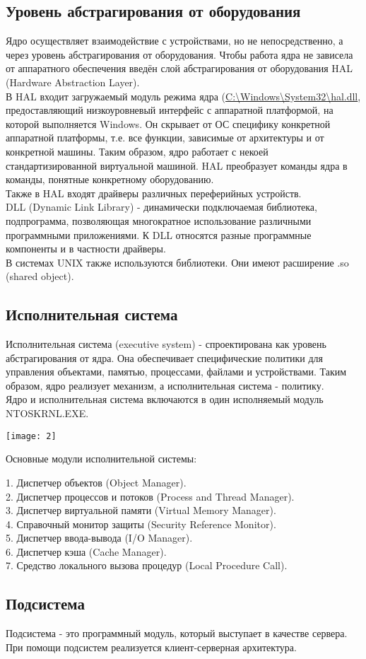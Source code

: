 \documentclass[a4paper]{article}
\begin{document}
\subsection{Уровень абстрагирования от оборудования}
Ядро осуществляет взаимодействие с устройствами, но не непосредственно, а через уровень абстрагирования от оборудования. Чтобы работа ядра не зависела от аппаратного обеспечения введён слой абстрагирования от оборудования HAL (Hardware Abstraction Layer).\\
В HAL входит загружаемый модуль режима ядра (\url{C:\Windows\System32\hal.dll}, предоставляющий низкоуровневый интерфейс с аппаратной платформой, на которой выполняется Windows. Он скрывает от ОС специфику конкретной аппаратной платформы, т.е. все функции, зависимые от архитектуры и от конкретной машины. Таким образом, ядро работает с некоей стандартизированной виртуальной машиной. HAL преобразует команды ядра в команды, понятные конкретному оборудованию.\\
Также в HAL входят драйверы различных переферийных устройств.\\
DLL (Dynamic Link Library) - динамически подключаемая библиотека, подпрограмма, позволяющая многократное использование различными программными приложениями. К DLL относятся разные программные компоненты и в частности драйверы.\\
В системах UNIX также используются библиотеки. Они имеют расширение .so (shared object).\\
\subsection{Исполнительная система}
Исполнительная система (executive system) - спроектирована как уровень абстрагирования от ядра. Она обеспечивает специфические политики для управления объектами, памятью, процессами, файлами и устройствами. Таким образом, ядро реализует механизм, а исполнительная система - политику.\\
Ядро и исполнительная система включаются в один исполняемый модуль NTOSKRNL.EXE.
\begin{center}
	\texttt{[image: 2]}
\end{center}
\begin{center}
Основные модули исполнительной системы:
\end{center}
1. Диспетчер объектов (Object Manager).\\
2. Диспетчер процессов и потоков (Process and Thread Manager).\\
3. Диспетчер виртуальной памяти (Virtual Memory Manager).\\
4. Справочный монитор защиты (Security Reference Monitor).\\
5. Диспетчер ввода-вывода (I/O Manager).\\
6. Диспетчер кэша (Cache Manager).\\
7. Средство локального вызова процедур (Local Procedure Call).\\
\subsection{Подсистема}
Подсистема - это программный модуль, который выступает в качестве сервера. При помощи подсистем реализуется клиент-серверная архитектура.
\end{document}
